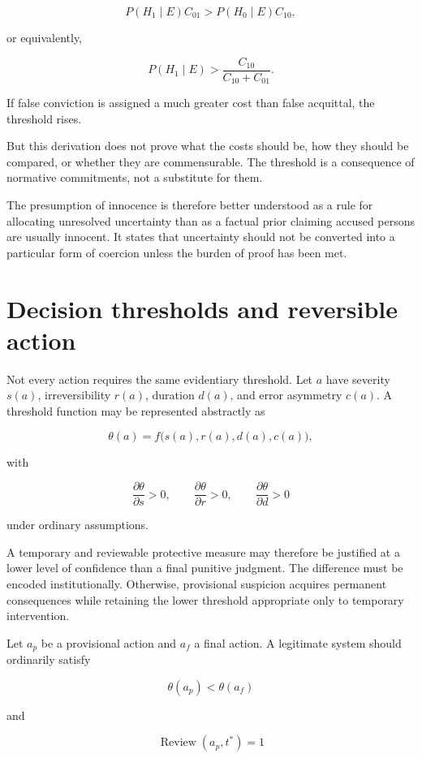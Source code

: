 \[
P(H_1\mid E)C_{01}
>
P(H_0\mid E)C_{10},
\]

or equivalently,

\[
P(H_1\mid E)
>
\frac{C_{10}}
{C_{10}+C_{01}}.
\]

If false conviction is assigned a much greater cost than false acquittal, the threshold rises.

But this derivation does not prove what the costs should be, how they should be compared, or whether they are commensurable. The threshold is a consequence of normative commitments, not a substitute for them.

The presumption of innocence is therefore better understood as a rule for allocating unresolved uncertainty than as a factual prior claiming accused persons are usually innocent. It states that uncertainty should not be converted into a particular form of coercion unless the burden of proof has been met.

\section{Decision thresholds and reversible action}
\label{sec:a32}

Not every action requires the same evidentiary threshold. Let \(a\) have severity \(s(a)\), irreversibility \(r(a)\), duration \(d(a)\), and error asymmetry \(c(a)\). A threshold function may be represented abstractly as

\[
\theta(a)
=
f\bigl(
s(a),r(a),d(a),c(a)
\bigr),
\]

with

\[
\frac{\partial\theta}{\partial s}>0,
\qquad
\frac{\partial\theta}{\partial r}>0,
\qquad
\frac{\partial\theta}{\partial d}>0
\]

under ordinary assumptions.

A temporary and reviewable protective measure may therefore be justified at a lower level of confidence than a final punitive judgment. The difference must be encoded institutionally. Otherwise, provisional suspicion acquires permanent consequences while retaining the lower threshold appropriate only to temporary intervention.

Let \(a_p\) be a provisional action and \(a_f\) a final action. A legitimate system should ordinarily satisfy

\[
\theta(a_p)<\theta(a_f)
\]

and

\[
\operatorname{Review}(a_p,t^\ast)=1
\]

